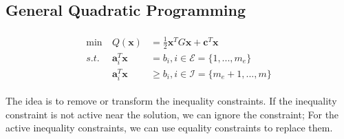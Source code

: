 \par
\subsection{General Quadratic Programming}
\begin{align}
    \begin{array}{lll}
        \min \ &Q(\mathbf{x}) &= \frac{1}{2}\mathbf{x}^T G\mathbf{x} + \mathbf{c}^T \mathbf{x} \\
        s.t. \ \ &\mathbf{a}_i^T \mathbf{x} &= b_i, i \in \mathcal{E} = \{1,...,m_e \} \\
        &\mathbf{a}_i^T \mathbf{x} &\geq b_i, i \in \mathcal{I} = \{m_e+1,...,m \}
    \end{array}
    \label{pro:general-quadratic-programming}
\end{align}

The idea is to remove or transform the inequality constraints.
If the inequality constraint is not active near the solution,
we can ignore the constraint; For the active inequality constraints,
we can use equality constraints to replace them.


